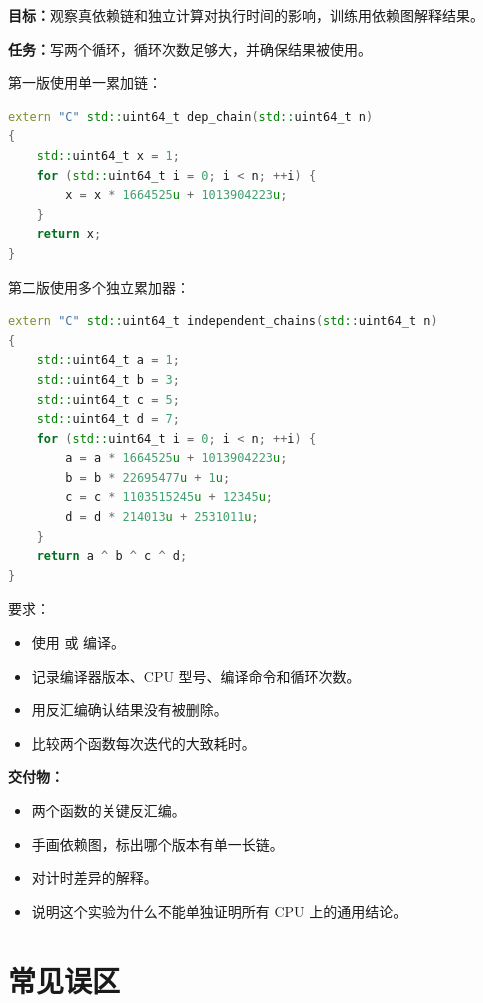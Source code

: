 \begin{labbox}
\textbf{目标：}观察真依赖链和独立计算对执行时间的影响，训练用依赖图解释结果。

\textbf{任务：}写两个循环，循环次数足够大，并确保结果被使用。

第一版使用单一累加链：

\begin{lstlisting}[language=C++]
extern "C" std::uint64_t dep_chain(std::uint64_t n)
{
    std::uint64_t x = 1;
    for (std::uint64_t i = 0; i < n; ++i) {
        x = x * 1664525u + 1013904223u;
    }
    return x;
}
\end{lstlisting}

第二版使用多个独立累加器：

\begin{lstlisting}[language=C++]
extern "C" std::uint64_t independent_chains(std::uint64_t n)
{
    std::uint64_t a = 1;
    std::uint64_t b = 3;
    std::uint64_t c = 5;
    std::uint64_t d = 7;
    for (std::uint64_t i = 0; i < n; ++i) {
        a = a * 1664525u + 1013904223u;
        b = b * 22695477u + 1u;
        c = c * 1103515245u + 12345u;
        d = d * 214013u + 2531011u;
    }
    return a ^ b ^ c ^ d;
}
\end{lstlisting}

要求：

\begin{itemize}
  \item 使用  或  编译。
  \item 记录编译器版本、CPU 型号、编译命令和循环次数。
  \item 用反汇编确认结果没有被删除。
  \item 比较两个函数每次迭代的大致耗时。
\end{itemize}

\textbf{交付物：}

\begin{itemize}
  \item 两个函数的关键反汇编。
  \item 手画依赖图，标出哪个版本有单一长链。
  \item 对计时差异的解释。
  \item 说明这个实验为什么不能单独证明所有 CPU 上的通用结论。
\end{itemize}
\end{labbox}

\section{常见误区}

